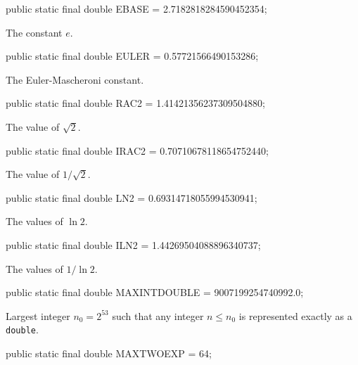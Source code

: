 \begin{code}

   public static final double EBASE = 2.7182818284590452354;
\end{code}
 \begin{tabb} The constant $e$.
 \end{tabb}
\begin{code}

   public static final double EULER = 0.57721566490153286;
\end{code}
 \begin{tabb} The Euler-Mascheroni constant.
 \end{tabb}
\begin{code}

   public static final double RAC2 = 1.41421356237309504880;
\end{code}
 \begin{tabb} The value of $\sqrt{2}$.
 \end{tabb}
\begin{code}

   public static final double IRAC2 = 0.70710678118654752440;
\end{code}
 \begin{tabb} The value of $1/\sqrt{2}$.
 \end{tabb}
\begin{code}

   public static final double LN2 = 0.69314718055994530941;
\end{code}
 \begin{tabb} The values of $\ln 2$.
 \end{tabb}
\begin{code}

   public static final double ILN2 = 1.44269504088896340737;
\end{code}
 \begin{tabb} The values of $1/\ln 2$.
 \end{tabb}
\begin{code}

   public static final double MAXINTDOUBLE = 9007199254740992.0;
\end{code}
  \begin{tabb} Largest integer $n_0 = 2^{53}$ such that any integer
  $n \le n_0$ is represented  exactly as a \texttt{double}.
  \end{tabb}
\begin{code}

   public static final double MAXTWOEXP = 64;
\end{code}
